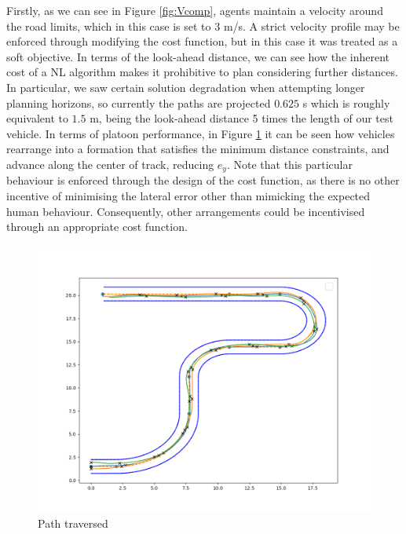 \documentclass[letterpaper, 10 pt, conference]{ieeeconf}  %
\begin{document}
Firstly, as we can see in Figure \ref{fig:Vcomp}, agents maintain a velocity around the road limits, which in this case is set to $3$ m/s. A strict velocity profile may be enforced through modifying the cost function, but in this case it was treated as a soft objective.  In terms of the look-ahead distance, we can see how the inherent cost of a NL algorithm makes it prohibitive to plan considering further distances. In particular, we saw certain solution degradation when attempting longer planning horizons, so currently the paths are projected $0.625$ s which is roughly equivalent to $1.5$ m, being the look-ahead distance 5 times the length of our test vehicle. In terms of platoon performance, in Figure \ref{fig:FvC} it can be seen how vehicles rearrange into a formation that satisfies the minimum distance constraints, and advance along the center of track, reducing $e_y$. Note that this particular behaviour is enforced through the design of the cost function, as there is no other incentive of minimising the lateral error other than mimicking the expected human behaviour. Consequently, other arrangements could be incentivised through an appropriate cost function. 

\begin{figure}
  \centering
  \includegraphics[width=\columnwidth]{figs/track_NL.png}
    \caption{Path traversed }
    \label{fig:FvC}
\end{figure}
\end{document}
